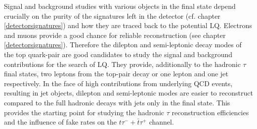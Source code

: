 Signal and background studies with various objects in the final state depend crucially on the purity of the signatures left in the detector (cf. chapter \ref{detectorsignatures}) and how they are traced back to the potential LQ. Electrons and muons provide a good chance for reliable reconstruction (see chapter \ref{detectorsignatures}). Therefore the dilepton and semi-leptonic decay modes of the top quark-pair are good candidates to study the signal and background contributions for the search of LQ. They provide, additionally to the hadronic $\tau$ final states, two leptons from the top-pair decay or one lepton and one jet respectively. In the face of high contributions from underlying QCD events, resulting in jet objects, dilepton and semi-leptonic modes are easier to reconstruct compared to the full hadronic decays with jets only in the final state. This provides the starting point for studying the hadronic $\tau$ reconstruction efficiencies and the influence of fake rates on the $t\tau^{-}+\bar{t}\tau^{+}$ channel.
%
